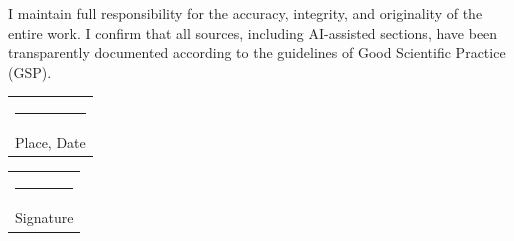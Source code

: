I maintain full responsibility for the accuracy, integrity, and originality of the entire work. I
confirm that all sources, including AI-assisted sections, have been transparently documented
according to the guidelines of Good Scientific Practice (GSP).

\vspace{3cm}

\hfill
\begin{tabular}[t]{c}
    \rule{17em}{0.4pt}\\Place, Date
\end{tabular}
\hfill
\begin{tabular}[t]{c}
    \rule{17em}{0.4pt}\\Signature
\end{tabular}
\hfill
